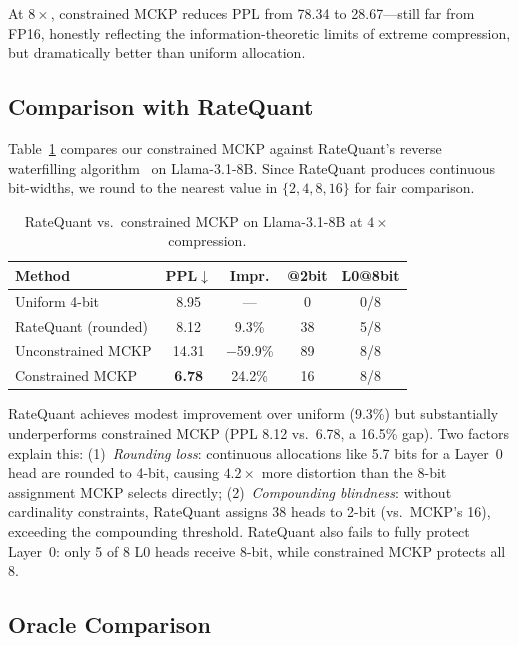 \documentclass[11pt,a4paper]{article}
\begin{document}
At $8\times$, constrained MCKP reduces PPL from 78.34 to 28.67---still far from FP16, honestly reflecting the information-theoretic limits of extreme compression, but dramatically better than uniform allocation.

\subsection{Comparison with RateQuant}

Table~\ref{tab:ratequant} compares our constrained MCKP against RateQuant's reverse waterfilling algorithm~\cite{ratequant2026} on Llama-3.1-8B.
Since RateQuant produces continuous bit-widths, we round to the nearest value in $\{2,4,8,16\}$ for fair comparison.

\begin{table}[t]
\centering
\small
\caption{RateQuant vs.\ constrained MCKP on Llama-3.1-8B at $4\times$ compression.}
\label{tab:ratequant}
\begin{tabular}{lcccc}
\toprule
\textbf{Method} & \textbf{PPL}$\downarrow$ & \textbf{Impr.} & \textbf{@2bit} & \textbf{L0@8bit} \\
\midrule
Uniform 4-bit & 8.95 & --- & 0 & 0/8 \\
RateQuant (rounded) & 8.12 & 9.3\% & 38 & 5/8 \\
Unconstrained MCKP & 14.31 & $-$59.9\% & 89 & 8/8 \\
Constrained MCKP & \textbf{6.78} & 24.2\% & 16 & 8/8 \\
\bottomrule
\end{tabular}
\end{table}

RateQuant achieves modest improvement over uniform (9.3\%) but substantially underperforms constrained MCKP (PPL 8.12 vs.\ 6.78, a 16.5\% gap).
Two factors explain this:
(1)~\emph{Rounding loss}: continuous allocations like 5.7 bits for a Layer~0 head are rounded to 4-bit, causing $4.2\times$ more distortion than the 8-bit assignment MCKP selects directly;
(2)~\emph{Compounding blindness}: without cardinality constraints, RateQuant assigns 38 heads to 2-bit (vs.\ MCKP's 16), exceeding the compounding threshold.
RateQuant also fails to fully protect Layer~0: only 5 of 8 L0 heads receive 8-bit, while constrained MCKP protects all 8.

\subsection{Oracle Comparison}
\end{document}
